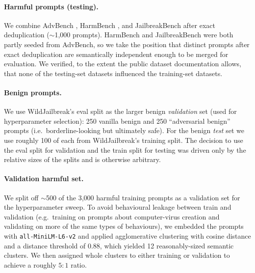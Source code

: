 \documentclass[11pt]{article}
\begin{document}
\paragraph{Harmful prompts (testing).} We combine
AdvBench \citep{zou2023gcg}, HarmBench \citep{mazeika2024harmbench}, and
JailbreakBench \citep{chao2024jailbreakbench} after exact deduplication
($\sim$1{,}000 prompts). HarmBench and JailbreakBench were both partly seeded
from AdvBench, so we take the position that distinct prompts after exact
deduplication are semantically independent enough to be merged for evaluation.
We verified, to the extent the public dataset documentation allows, that none
of the testing-set datasets influenced the training-set datasets.

\paragraph{Benign prompts.} We use WildJailbreak's eval split as the larger
benign \emph{validation} set (used for hyperparameter selection): 250 vanilla
benign and 250 ``adversarial benign'' prompts (i.e.\ borderline-looking but
ultimately safe). For the benign \emph{test} set we use roughly 100 of each
from WildJailbreak's training split. The decision to use the eval split for
validation and the train split for testing was driven only by the relative
sizes of the splits and is otherwise arbitrary.

\paragraph{Validation harmful set.} We split off $\sim$500 of the 3{,}000
harmful training prompts as a validation set for the hyperparameter sweep. To
avoid behavioural leakage between train and validation (e.g.\ training on
prompts about computer-virus creation and validating on more of the same types of behaviours), we
embedded the prompts with \texttt{all-MiniLM-L6-v2} and applied agglomerative
clustering with cosine distance and a distance threshold of $0.88$, which
yielded 12 reasonably-sized semantic clusters. We then assigned whole clusters
to either training or validation to achieve a roughly $5{:}1$ ratio.
\end{document}

